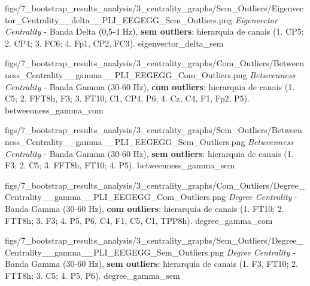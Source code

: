 \ultrawidefigure
{figs/7_bootstrap_results_analysis/3_centrality_graphs/Sem_Outliers/Eigenvector_Centrality__delta__PLI_EEGEGG_Sem_Outliers.png}
{\textit{Eigenvector Centrality} - Banda Delta (0{,}5-4 Hz), \textbf{sem outliers}: hierarquia de canais (1. CP5; 2. CP4; 3. FC6; 4. Fp1, CP2, FC3).}
{eigenvector_delta_sem}


\ultrawidefigure
{figs/7_bootstrap_results_analysis/3_centrality_graphs/Com_Outliers/Betweenness_Centrality__gamma__PLI_EEGEGG_Com_Outliers.png}
{\textit{Betweenness Centrality} - Banda Gamma (30-60 Hz), \textbf{com outliers}: hierarquia de canais (1. C5; 2. FFT8h, F3; 3. FT10, C1, CP4, P6; 4. Cz, C4, F1, Fp2, P5).}
{betweenness_gamma_com}

\ultrawidefigure
{figs/7_bootstrap_results_analysis/3_centrality_graphs/Sem_Outliers/Betweenness_Centrality__gamma__PLI_EEGEGG_Sem_Outliers.png}
{\textit{Betweenness Centrality} - Banda Gamma (30-60 Hz), \textbf{sem outliers}: hierarquia de canais (1. F3; 2. C5; 3. FFT8h, FT10; 4. P5).}
{betweenness_gamma_sem}


\ultrawidefigure
{figs/7_bootstrap_results_analysis/3_centrality_graphs/Com_Outliers/Degree_Centrality__gamma__PLI_EEGEGG_Com_Outliers.png}
{\textit{Degree Centrality} - Banda Gamma (30-60 Hz), \textbf{com outliers}: hierarquia de canais (1. FT10; 2. FTT8h; 3. F3; 4. P5, P6, C4, F1, C5, C1, TPP8h).}
{degree_gamma_com}

\ultrawidefigure
{figs/7_bootstrap_results_analysis/3_centrality_graphs/Sem_Outliers/Degree_Centrality__gamma__PLI_EEGEGG_Sem_Outliers.png}
{\textit{Degree Centrality} - Banda Gamma (30-60 Hz), \textbf{sem outliers}: hierarquia de canais (1. F3, FT10; 2. FTT8h; 3. C5; 4. P5, P6).}
{degree_gamma_sem}


